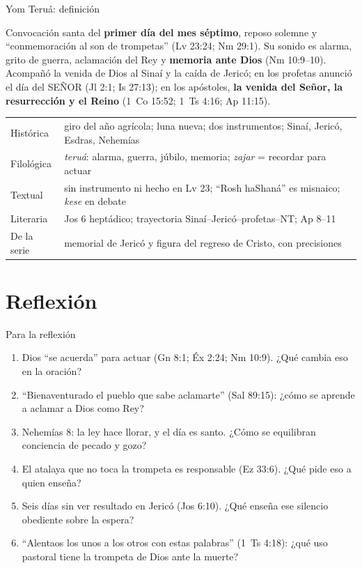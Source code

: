 \documentclass[hyperref={bookmarks=false},aspectratio=169]{beamer}
\newcommand{\SENOR}{S{\fontsize{0.78em}{1em}\selectfont EÑOR}}
\newcommand{\destacar}[1]{\textbf{\textcolor{tierraroja}{#1}}}
\begin{document}
\begin{frame}{Yom Teruá: definición}
\begin{tcolorbox}[colback=papiro,colframe=tierraroja,boxrule=1pt,arc=3pt,fontupper=\small]
\RaggedRight Convocación santa del \destacar{primer día del mes séptimo}, reposo solemne y ``conmemoración al son de trompetas'' (Lv 23:24; Nm 29:1). Su sonido es alarma, grito de guerra, aclamación del Rey y \destacar{memoria ante Dios} (Nm 10:9--10). Acompañó la venida de Dios al Sinaí y la caída de Jericó; en los profetas anunció el día del \SENOR{} (Jl 2:1; Is 27:13); en los apóstoles, \destacar{la venida del Señor, la resurrección y el Reino} (1~Co 15:52; 1~Ts 4:16; Ap 11:15).
\end{tcolorbox}
\scriptsize\renewcommand{\arraystretch}{1.08}
\begin{tabular}{@{}L{2.2cm}L{9.4cm}@{}}
\toprule
Histórica & giro del año agrícola; luna nueva; dos instrumentos; Sinaí, Jericó, Esdras, Nehemías \\
Filológica & \emph{teruá}: alarma, guerra, júbilo, memoria; \emph{zajar} = recordar para actuar \\
Textual & sin instrumento ni hecho en Lv 23; ``Rosh haShaná'' es misnaico; \emph{kese} en debate \\
Literaria & Jos 6 heptádico; trayectoria Sinaí--Jericó--profetas--NT; Ap 8--11 \\
De la serie & memorial de Jericó y figura del regreso de Cristo, con precisiones \\
\bottomrule
\end{tabular}
\end{frame}

\section{Reflexión}

\begin{frame}{Para la reflexión}
\small\RaggedRight
\begin{enumerate}
\item Dios ``se acuerda'' para actuar (Gn 8:1; Éx 2:24; Nm 10:9). ¿Qué cambia eso en la oración?
\item ``Bienaventurado el pueblo que sabe aclamarte'' (Sal 89:15): ¿cómo se aprende a aclamar a Dios como Rey?
\item Nehemías 8: la ley hace llorar, y el día es santo. ¿Cómo se equilibran conciencia de pecado y gozo?
\item El atalaya que no toca la trompeta es responsable (Ez 33:6). ¿Qué pide eso a quien enseña?
\item Seis días sin ver resultado en Jericó (Jos 6:10). ¿Qué enseña ese silencio obediente sobre la espera?
\item ``Alentaos los unos a los otros con estas palabras'' (1~Ts 4:18): ¿qué uso pastoral tiene la trompeta de Dios ante la muerte?
\end{enumerate}
\end{frame}
\end{document}
